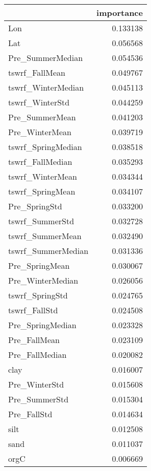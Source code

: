 \begin{tabular}{lr}
\toprule
 & importance \\
\midrule
Lon & 0.133138 \\
Lat & 0.056568 \\
Pre_SummerMedian & 0.054536 \\
tswrf_FallMean & 0.049767 \\
tswrf_WinterMedian & 0.045113 \\
tswrf_WinterStd & 0.044259 \\
Pre_SummerMean & 0.041203 \\
Pre_WinterMean & 0.039719 \\
tswrf_SpringMedian & 0.038518 \\
tswrf_FallMedian & 0.035293 \\
tswrf_WinterMean & 0.034344 \\
tswrf_SpringMean & 0.034107 \\
Pre_SpringStd & 0.033200 \\
tswrf_SummerStd & 0.032728 \\
tswrf_SummerMean & 0.032490 \\
tswrf_SummerMedian & 0.031336 \\
Pre_SpringMean & 0.030067 \\
Pre_WinterMedian & 0.026056 \\
tswrf_SpringStd & 0.024765 \\
tswrf_FallStd & 0.024508 \\
Pre_SpringMedian & 0.023328 \\
Pre_FallMean & 0.023109 \\
Pre_FallMedian & 0.020082 \\
clay & 0.016007 \\
Pre_WinterStd & 0.015608 \\
Pre_SummerStd & 0.015304 \\
Pre_FallStd & 0.014634 \\
silt & 0.012508 \\
sand & 0.011037 \\
orgC & 0.006669 \\
\bottomrule
\end{tabular}
